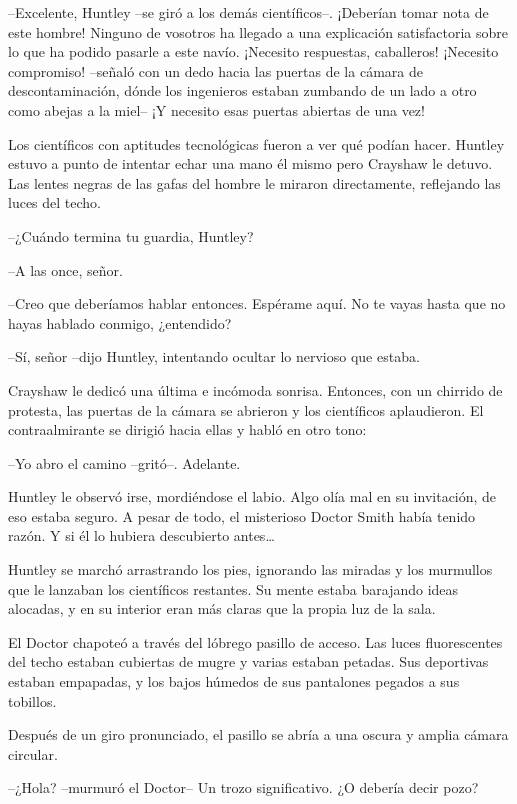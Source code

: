{--Excelente, Huntley --se giró a los demás científicos--. ¡Deberían
 tomar nota de este hombre! Ninguno de vosotros ha llegado a una
 explicación satisfactoria sobre lo que ha podido pasarle a este navío.
 ¡Necesito respuestas, caballeros! ¡Necesito compromiso! --señaló con un
 dedo hacia las puertas de la cámara de descontaminación, dónde los
 ingenieros estaban zumbando de un lado a otro como abejas a la miel-- ¡Y
necesito esas puertas abiertas de una vez!}

{Los científicos con aptitudes tecnológicas fueron a ver qué podían
 hacer. Huntley estuvo a punto de intentar echar una mano él mismo pero
 Crayshaw le detuvo. Las lentes negras de las gafas del hombre le miraron
directamente, reflejando las luces del techo.}

{--¿Cuándo termina tu guardia, Huntley?}

{--A las once, señor.}

{--Creo que deberíamos hablar entonces. Espérame aquí. No te vayas hasta
que no hayas hablado conmigo, ¿entendido?}

{--Sí, señor --dijo Huntley, intentando ocultar lo nervioso que estaba.}

{Crayshaw le dedicó una última e incómoda sonrisa. Entonces, con un
 chirrido de protesta, las puertas de la cámara se abrieron y los
 científicos aplaudieron. El contraalmirante se dirigió hacia ellas y
habló en otro tono:}

{--Yo abro el camino --gritó--. Adelante.}

{Huntley le observó irse, mordiéndose el labio. Algo olía mal en su
 invitación, de eso estaba seguro. A pesar de todo, el misterioso Doctor
 Smith había tenido razón. Y si él lo hubiera descubierto antes\ldots{}}

{Huntley se marchó arrastrando los pies, ignorando las miradas y los
 murmullos que le lanzaban los científicos restantes. Su mente estaba
 barajando ideas alocadas, y en su interior eran más claras que la propia
luz de la sala.}

\mbox{}

{El Doctor chapoteó a través del lóbrego pasillo de acceso. Las luces
 fluorescentes del techo estaban cubiertas de mugre y varias estaban
 petadas. Sus deportivas estaban empapadas, y los bajos húmedos de sus
pantalones pegados a sus tobillos.}

{Después de un giro pronunciado, el pasillo se abría a una oscura y
amplia cámara circular.}

{--¿Hola? --murmuró el Doctor-- Un trozo significativo. ¿O debería decir
pozo?}

